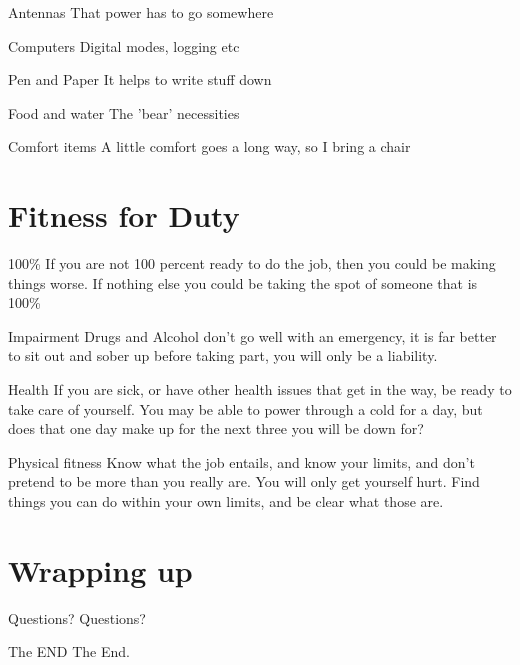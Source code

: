 \documentclass[11pt]{beamer}
\begin{document}
\begin{frame}{Antennas}
That power has to go somewhere
\end{frame}

\begin{frame}{Computers}
Digital modes, logging etc
\end{frame}

\begin{frame}{Pen and Paper}
It helps to write stuff down
\end{frame}

\begin{frame}{Food and water}
The 'bear' necessities
\end{frame}

\begin{frame}{Comfort items}
A little comfort goes a long way, so I bring a chair
\end{frame}



\section{Fitness for Duty}

\begin{frame}{100\%}
If you are not 100 percent ready to do the job, then you could be making things worse. If nothing else you could be taking the spot of someone that is 100\%
\end{frame}

\begin{frame}{Impairment}
Drugs and Alcohol don't go well with an emergency, it is far better to sit out and sober up before taking part, you will only be a liability.
\end{frame}

\begin{frame}{Health}
If you are sick, or have other health issues that get in the way, be ready to take care of yourself. You may be able to power through a cold for a day, but does that one day make up for the next three you will be down for?
\end{frame}

\begin{frame}{Physical fitness}
Know what the job entails, and know your limits, and don't pretend to be more than you really are. You will only get yourself hurt. Find things you can do within your own limits, and be clear what those are.
\end{frame}

\section{Wrapping up}

\begin{frame}{Questions?}
Questions?
\end{frame}

\begin{frame}{The END}
The End.
\end{frame}
\end{document}
